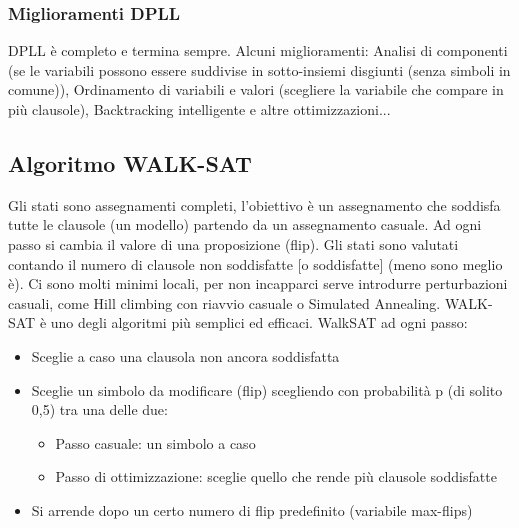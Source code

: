 \documentclass{article}
\begin{document}
\subsubsection{Miglioramenti DPLL}
DPLL è completo e termina sempre. Alcuni miglioramenti: Analisi di componenti (se le variabili possono essere suddivise in sotto-insiemi disgiunti (senza simboli in comune)), Ordinamento di variabili e valori (scegliere la variabile che compare in più clausole), Backtracking intelligente e altre ottimizzazioni...

\subsection{Algoritmo WALK-SAT}
Gli stati sono assegnamenti completi, l’obiettivo è un assegnamento che soddisfa tutte le clausole (un modello) partendo da un assegnamento casuale. Ad ogni passo si cambia il valore di una proposizione (flip). Gli stati sono valutati contando il numero di clausole non soddisfatte [o soddisfatte] (meno sono meglio è). Ci sono molti minimi locali, per non incapparci serve introdurre perturbazioni casuali, come Hill climbing con riavvio casuale o Simulated Annealing. WALK-SAT è uno degli algoritmi più semplici ed efficaci. \newline 
WalkSAT ad ogni passo: 
\begin{itemize}
    \item Sceglie a caso una clausola non ancora soddisfatta
    \item Sceglie un simbolo da modificare (flip) scegliendo con probabilità p (di solito 0,5) tra una delle due: \begin{itemize}
        \item Passo casuale: un simbolo a caso
        \item Passo di ottimizzazione: sceglie quello che rende più clausole soddisfatte
    \end{itemize}
    \item Si arrende dopo un certo numero di flip predefinito (variabile max-flips)
\end{itemize}
\end{document}
